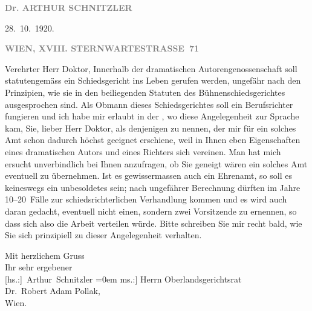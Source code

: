 \pstart
           {\pb}\textcolor{gray}{\textbf{Dr. ARTHUR SCHNITZLER}}\pend
           
\pstart
           \raggedleft{}28. 10. 1920.\pend
           \pend
           
\pstart
           \textcolor{gray}{\textbf{WIEN, XVIII. STERNWARTESTRASSE 71}}\pend
           
\pstart{}Verehrter Herr Doktor,\pend\vspace{0.5em}
\pstart
           Innerhalb der dramatischen Autorengenossenschaft
               soll  statutengemäss ein Schiedsgericht ins Leben
               gerufen werden, ungefähr nach den Prinzipien, wie sie in den beiliegenden Statuten
               des Bühnenschiedsgerichtes ausgesprochen sind. Als Obmann dieses Schiedsgerichtes
               soll ein Berufsrichter fungieren und ich habe mir erlaubt in der \label{K_L02356-1v}\label{K_L02356-1}, wo diese Angelegenheit zur Sprache kam, Sie, lieber Herr Doktor, als
               denjenigen zu nennen, der mir für ein solches Amt schon dadurch höchst geeignet
               erschiene, weil in Ihnen eben Eigenschaften eines dramatischen Autors und eines
               Richters sich vereinen. Man hat mich ersucht unverbindlich bei Ihnen anzufragen, ob
               Sie geneigt wären ein solches Amt eventuell zu übernehmen. Ist es gewissermassen auch
               ein Ehrenamt, so soll es keineswegs ein unbesoldetes sein; nach ungefährer Berechnung
               dürften im Jahre 10–20 Fälle zur schiedsrichterlichen Verhandlung kommen und es wird
               auch daran gedacht, eventuell nicht einen, sondern zwei Vorsitzende zu ernennen, so
               dass sich also die Arbeit verteilen würde. Bitte schreiben Sie mir recht bald, wie
               Sie sich prinzipiell zu dieser Angelegenheit verhalten.\pend
           
\pstart
           Mit herzlichem Gruss{\\[\baselineskip]}Ihr sehr ergebener{\\[\baselineskip]}\spacefill\mbox{{[}hs.:{]} Arthur Schnitzler}\pend
           \leftskip=0em{}
\pstart
           \noindent{}{[}ms.:{]} Herrn Oberlandsgerichtsrat{\\}Dr. Robert Adam Pollak,{\\}Wien.\pend
           \endnumbering{}  \newcommand{\dateiname}{L02356}\newcommand{\titel}{Arthur Schnitzler an Robert Adam, 28. 10. 1920}\newcommand{\editorInnen}{Martin Anton Müller und Gerd-Hermann Susen}
